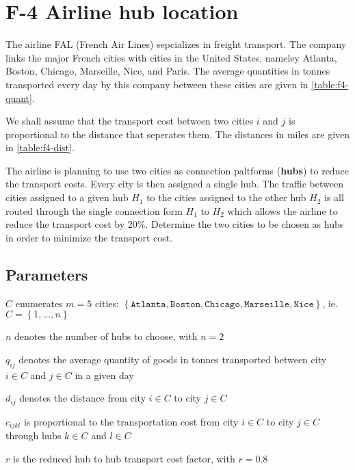 \chapter{F-4 Airline hub location}

The airline FAL (French Air Lines) sepcializes in freight transport. The company
links the major French cities with cities in the United States,
nameley Atlanta, Boston, Chicago, Marseille, Nice, and Paris. The average
quantities in tonnes transported every day by this company between these cities
are given in \cref{table:f4-quant}.

We shall assume that the transport cost between two cities $i$ and $j$
is proportional to the distance that seperates them. The distances in miles
are given in \cref{table:f4-dist}.

The airline is planning to use two cities as connection paltforms
(\textbf{hubs}) to reduce the transport costs. Every city is then assigned a single
hub. The traffic between cities assigned to a given hub $H_1$ to the cities
assigned to the other hub $H_2$ is all routed through the single connection
form $H_1$ to $H_2$ which allows the airline to reduce the transport cost
by 20\%. Determine the two cities to be chosen as hubs in order to minimize
the transport cost.

\section{Parameters}

\begin{syms}

\item[$C$] enumerates $m=5$ cities: 
$\left\lbrace \texttt{Atlanta}, \texttt{Boston}, \texttt{Chicago}, \texttt{Marseille}, \texttt{Nice}\right\rbrace$,
ie. $C=\left\lbrace 1, \ldots, n\right\rbrace$

\item[$n$] denotes the number of hubs to choose, with $n=2$
    
\item[$q_{ij}$] denotes the average quantity of goods in tonnes transported between city
    $i\in C$ and $j\in C$ in a given day

\item[$d_{ij}$] denotes the distance from city $i\in C$ to city $j\in C$


\item[$c_{ijkl}$] is proportional to the transportation cost from city $i\in C$ to city $j\in C$ through
    hubs $k\in C$ and $l\in C$

\item[$r$] is the reduced hub to hub transport cost factor, with $r=0.8$

\end{syms}

